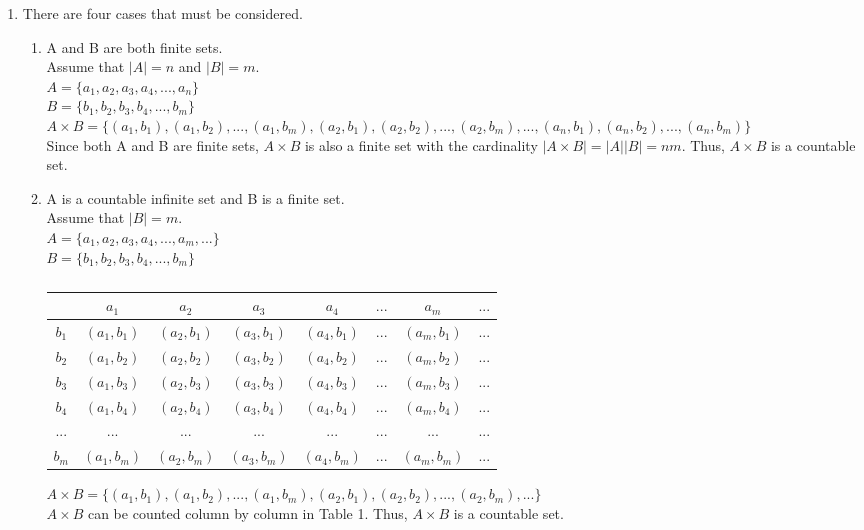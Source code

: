 \documentclass[12pt]{article}
\begin{document}
\renewcommand{\theenumi}{\alph{enumi}}
\renewcommand{\theenumii}{\roman{enumii}}
\begin{enumerate}
  \item There are four cases that must be considered.
  
  \begin{enumerate}
    \item A and B are both finite sets.\\
        Assume that $|A| = n$ and $|B| = m$.\\
        $A = \{a_1, a_2, a_3, a_4, ..., a_n\}$ \\
        $B = \{b_1, b_2, b_3, b_4, ..., b_m\}$ \\
        $A \times B = \{(a_1, b_1), (a_1, b_2), ..., (a_1, b_m), (a_2, b_1), (a_2, b_2), ..., (a_2, b_m), ..., (a_n, b_1), (a_n, b_2), ..., (a_n, b_m)\}$ \\
        Since both A and B are finite sets, $A \times B$ is also a finite set with the cardinality $|A \times B| = |A||B| = nm$. Thus, $A \times B$ is a countable set.
    \item A is a countable infinite set and B is a finite set.\\
        Assume that $|B| = m$.\\
        $A = \{a_1, a_2, a_3, a_4, ..., a_m, ...\}$ \\
        $B = \{b_1, b_2, b_3, b_4, ..., b_m\}$ \\
        
        \begin{table}[H]
        \caption{}
        \begin{center}
        \begin{tabular}{ c | c c c c c c c }
                      & $a_1$ & $a_2$ & $a_3$ & $a_4$ & $...$ & $a_m$ & $...$ \\
                \hline
                $b_1$ & $(a_1, b_1)$ & $(a_2, b_1)$ & $(a_3, b_1)$ & $(a_4, b_1)$ & $...$ & $(a_m, b_1)$ & $...$ \\ 
                $b_2$ & $(a_1, b_2)$ & $(a_2, b_2)$ & $(a_3, b_2)$ & $(a_4, b_2)$ & $...$ & $(a_m, b_2)$ & $...$ \\ 
                $b_3$ & $(a_1, b_3)$ & $(a_2, b_3)$ & $(a_3, b_3)$ & $(a_4, b_3)$ & $...$ & $(a_m, b_3)$ & $...$ \\ 
                $b_4$ & $(a_1, b_4)$ & $(a_2, b_4)$ & $(a_3, b_4)$ & $(a_4, b_4)$ & $...$ & $(a_m, b_4)$ & $...$ \\ 
                $...$ & $...$ & $...$ & $...$ & $...$ & $...$ & $...$ & $...$ \\ 
                $b_m$ & $(a_1, b_m)$ & $(a_2, b_m)$ & $(a_3, b_m)$ & $(a_4, b_m)$ & $...$ & $(a_m, b_m)$ & $...$ \\ 
        \end{tabular}
        \end{center}
        \end{table}
        $A \times B = \{ (a_1, b_1), (a_1, b_2), ..., (a_1, b_m), (a_2, b_1), (a_2, b_2), ..., (a_2, b_m), ... \}$\\
        $A \times B$ can be counted column by column in Table 1. Thus, $A \times B$ is a countable set.
        

\end{enumerate}
\end{enumerate}
\end{document}
